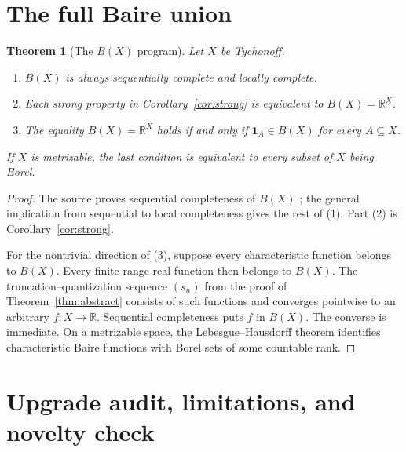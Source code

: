 \documentclass[11pt]{article}
\newtheorem{theorem}{Theorem}
\newcommand{\R}{\mathbb{R}}
\begin{document}
\section{The full Baire union}

\begin{theorem}[The $B(X)$ program]\label{thm:union}
Let $X$ be Tychonoff.
\begin{enumerate}
\item $B(X)$ is always sequentially complete and locally complete.
\item Each strong property in Corollary~\ref{cor:strong} is equivalent to
      $B(X)=\R^X$.
\item The equality $B(X)=\R^X$ holds if and only if
      $\mathbf 1_A\in B(X)$ for every $A\subseteq X$.
\end{enumerate}
If $X$ is metrizable, the last condition is equivalent to every subset of
$X$ being Borel.
\end{theorem}

\begin{proof}
The source proves sequential completeness of $B(X)$
\cite[Proposition~3.1]{GOR2026}; the general implication from sequential to
local completeness gives the rest of (1).  Part (2) is
Corollary~\ref{cor:strong}.

For the nontrivial direction of (3), suppose every characteristic function
belongs to $B(X)$.  Every finite-range real function then belongs to $B(X)$.
The truncation--quantization sequence $(s_n)$ from the proof of
Theorem~\ref{thm:abstract} consists of such functions and converges pointwise
to an arbitrary $f:X\to\R$.  Sequential completeness puts $f$ in $B(X)$.
The converse is immediate.  On a metrizable space, the
Lebesgue--Hausdorff theorem identifies characteristic Baire functions with
Borel sets of some countable rank.
\end{proof}

\section{Upgrade audit, limitations, and novelty check}
\end{document}
